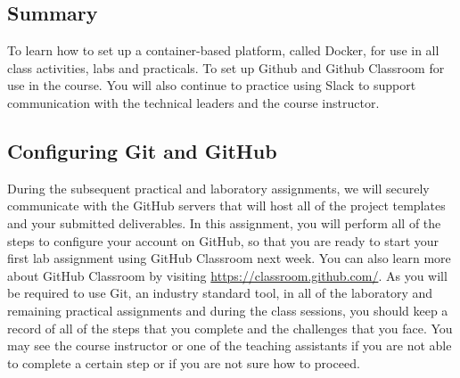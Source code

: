 
\newcommand{\command}[1]{``\lstinline{#1}''}
\newcommand{\program}[1]{\lstinline{#1}}
\newcommand{\channel}[1]{\lstinline{#1}}
\newcommand{\option}[1]{``{#1}''}
\newcommand{\step}[1]{``{#1}''}

\long{}



\subsection*{Summary}
To learn how to set up a container-based platform, called Docker, for use in all class activities, labs and practicals. To set up Github and Github Classroom for use in the course. You will
also continue to practice using Slack to support communication with the technical leaders and the course instructor.

\vspace*{-.2in}
\subsection*{Configuring Git and GitHub}
\vspace*{-.1in}

During the subsequent practical and  laboratory assignments, we will securely communicate
with the GitHub servers that will host all of the project templates and your submitted deliverables. In this assignment,
you will perform all of the steps to configure your account on GitHub, so that you are ready to start your first lab assignment using
GitHub Classroom next week.  You can
also learn more about GitHub Classroom by visiting \url{https://classroom.github.com/}. As you will be required to use
Git, an industry standard tool, in all of the  laboratory and remaining practical assignments and during the class
sessions, you should keep a record of all of the steps that you complete and the challenges that you face. You may see
the course instructor or one of the teaching assistants if you are not able to complete a certain step or if you are not
sure how to proceed.

